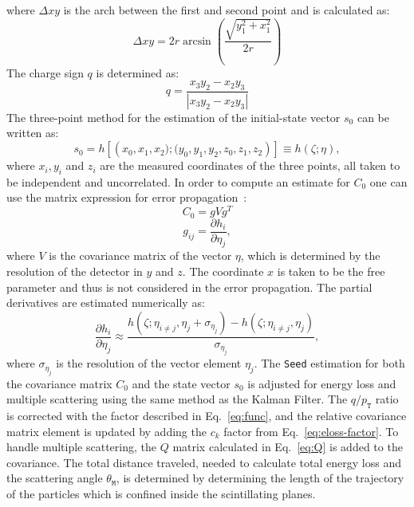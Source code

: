 where $\Delta xy$ is the arch between the first and second point and is calculated as:
\begin{equation}
    \Delta xy = 2r \arcsin \left( \frac{\sqrt{y_1^2+x_1^2}}{2r}\right)
\end{equation}
The charge sign $q$ is determined as:
\begin{equation}
    q = \frac{x_3y_2-x_2y_3}{|x_3y_2-x_2y_3|}
\end{equation}
The three-point method for the estimation of the initial-state vector $s_0$ can be written as: 
\begin{equation}
    s_0 = h\left[\left(x_0,x_1,x_2);(y_0,y_1,y_2,z_0,z_1, z_2\right)\right]\equiv h(\zeta;\eta) ,
\end{equation}
where $x_i,y_i$ and $z_i$ are the measured coordinates of the three points, all taken to be independent and uncorrelated. In order to compute an estimate for $C_0$ one can use the matrix expression for error propagation~\cite{Cov}:
\begin{equation}\label{eq:error_Prop}
    C_0 = gVg^T 
\end{equation}
\begin{equation}
   g_{ij}  = \frac{\partial h_i}{\partial \eta_j},
\end{equation}
where $V$ is the covariance matrix of the vector $\eta$, which is determined by the resolution of the detector in $y$ and $z$. The coordinate $x$ is taken to be the free parameter and thus is not considered in the error propagation. The partial derivatives are estimated numerically as:
\begin{equation}
    \frac{\partial h_i}{\partial \eta_j} \approx \frac{h(\zeta;\eta_{i\neq j},\eta_j+\sigma_{\eta_j})-h(\zeta;\eta_{i\neq j},\eta_j)} {\sigma_{\eta_j}},
\end{equation}
where $\sigma_{\eta_j}$ is the resolution of the vector element $\eta_j$. The \texttt{Seed} estimation for both the covariance matrix $C_0$ and the state vector $s_0$ is adjusted for energy loss and multiple scattering using the same method as the Kalman Filter. The $q/p_\texttt{T}$ ratio is corrected with the factor described in Eq.~\ref{eq:func}, and the relative covariance matrix element is updated by adding the $c_k$ factor from Eq.~\ref{eq:eloss-factor}. To handle multiple scattering, the $Q$ matrix calculated in Eq.~\ref{eq:Q} is added to the covariance. The total distance traveled, needed to calculate total energy loss and the scattering angle $\theta_\texttt{M}$, is determined by determining the length of the trajectory of the particles which is confined inside the scintillating planes. 

